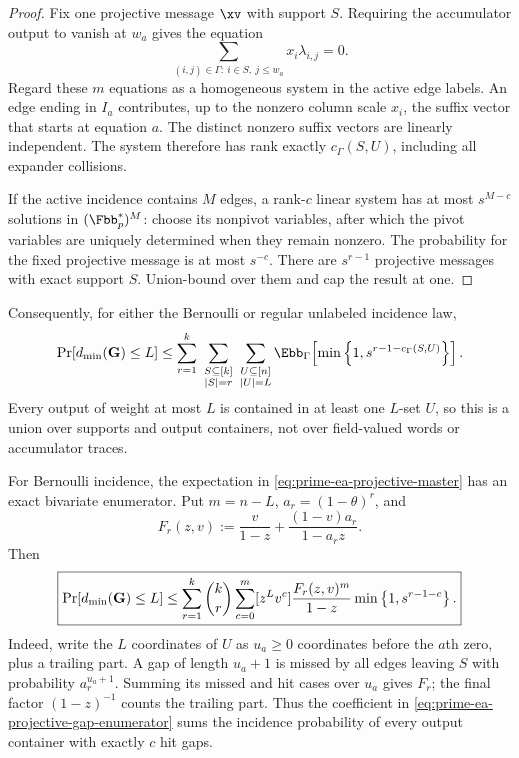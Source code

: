 \begin{proof}
Fix one projective message $\xv$ with support $S$.  Requiring the accumulator
output to vanish at $w_a$ gives the equation
\[
 \sum_{(i,j)\in\Gamma:\ i\in S,\ j\leq w_a}x_i\lambda_{i,j}=0.
\]
Regard these $m$ equations as a homogeneous system in the active edge labels.
An edge ending in $I_a$ contributes, up to the nonzero column scale $x_i$,
the suffix vector that starts at equation $a$.  The distinct nonzero suffix
vectors are linearly independent.  The system therefore has rank exactly
$c_\Gamma(S,U)$, including all expander collisions.

If the active incidence contains $M$ edges, a rank-$c$ linear system has at
most $s^{M-c}$ solutions in $(\Fbb_p^*)^M$: choose its nonpivot variables,
after which the pivot variables are uniquely determined when they remain
nonzero.  The probability for the fixed projective message is at most
$s^{-c}$.  There are $s^{r-1}$ projective messages with exact support $S$.
Union-bound over them and cap the result at one.
\end{proof}

Consequently, for either the Bernoulli or regular unlabeled incidence law,
\begin{equation}
 \Pr[d_{\min}(\G)\leq L]
 \leq
 \sum_{r=1}^k\ \sum_{\substack{S\subseteq[k]\\|S|=r}}
 \ \sum_{\substack{U\subseteq[n]\\|U|=L}}
 \Ebb_\Gamma\!\left[
  \min\left\{1,s^{r-1-c_\Gamma(S,U)}\right\}
 \right].
 \label{eq:prime-ea-projective-master}
\end{equation}
Every output of weight at most $L$ is contained in at least one $L$-set $U$,
so this is a union over supports and output containers, not over field-valued
words or accumulator traces.

For Bernoulli incidence, the expectation in
\eqref{eq:prime-ea-projective-master} has an exact bivariate enumerator.  Put
$m=n-L$, $a_r=(1-\theta)^r$, and
\begin{equation}
 F_r(z,v)
 :=\frac{v}{1-z}+\frac{(1-v)a_r}{1-a_rz}.
 \label{eq:prime-ea-gap-enumerator}
\end{equation}
Then
\begin{equation}
 \boxed{
 \Pr[d_{\min}(\mathbf G)\leq L]
 \leq
 \sum_{r=1}^k\binom{k}{r}
 \sum_{c=0}^{m}
 [z^Lv^c]\frac{F_r(z,v)^m}{1-z}
 \min\left\{1,s^{r-1-c}\right\}.
 }
 \label{eq:prime-ea-projective-gap-enumerator}
\end{equation}
Indeed, write the $L$ coordinates of $U$ as $u_a\geq0$ coordinates before
the $a$th zero, plus a trailing part.  A gap of length $u_a+1$ is missed by
all edges leaving $S$ with probability $a_r^{u_a+1}$.  Summing its missed and
hit cases over $u_a$ gives $F_r$; the final factor $(1-z)^{-1}$ counts the
trailing part.  Thus the coefficient in
\eqref{eq:prime-ea-projective-gap-enumerator} sums the incidence probability
of every output container with exactly $c$ hit gaps.

